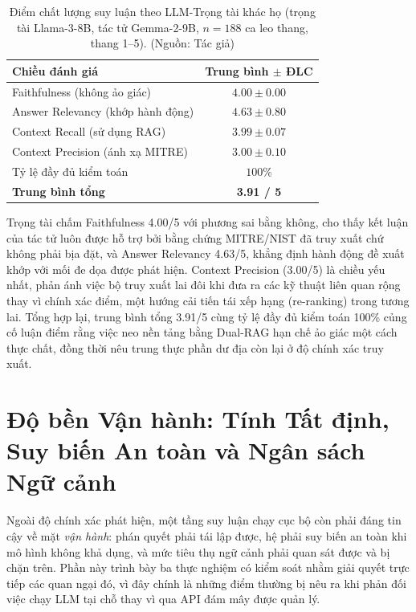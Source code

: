 \begin{table}[!htbp]
    \centering
    \caption{Điểm chất lượng suy luận theo LLM-Trọng tài khác họ (trọng tài Llama-3-8B, tác tử Gemma-2-9B, $n = 188$ ca leo thang, thang 1--5). (Nguồn: Tác giả)}
    \label{tab:ragas}
    \begin{tabular}{|l|c|}
        \hline
        \textbf{Chiều đánh giá} & \textbf{Trung bình $\pm$ ĐLC} \\
        \hline
        Faithfulness (không ảo giác) & $4.00 \pm 0.00$ \\
        \hline
        Answer Relevancy (khớp hành động) & $4.63 \pm 0.80$ \\
        \hline
        Context Recall (sử dụng RAG) & $3.99 \pm 0.07$ \\
        \hline
        Context Precision (ánh xạ MITRE) & $3.00 \pm 0.10$ \\
        \hline
        Tỷ lệ đầy đủ kiểm toán & $100\%$ \\
        \hline
        \textbf{Trung bình tổng} & \textbf{3.91 / 5} \\
        \hline
    \end{tabular}
\end{table}

Trọng tài chấm Faithfulness 4.00/5 với phương sai bằng không, cho thấy kết luận của tác tử luôn được hỗ trợ bởi bằng chứng MITRE/NIST đã truy xuất chứ không phải bịa đặt, và Answer Relevancy 4.63/5, khẳng định hành động đề xuất khớp với mối đe dọa được phát hiện. Context Precision (3.00/5) là chiều yếu nhất, phản ánh việc bộ truy xuất lai đôi khi đưa ra các kỹ thuật liên quan rộng thay vì chính xác điểm, một hướng cải tiến tái xếp hạng (re-ranking) trong tương lai. Tổng hợp lại, trung bình tổng 3.91/5 cùng tỷ lệ đầy đủ kiểm toán 100\% củng cố luận điểm rằng việc neo nền tảng bằng Dual-RAG hạn chế ảo giác một cách thực chất, đồng thời nêu trung thực phần dư địa còn lại ở độ chính xác truy xuất.

\section{Độ bền Vận hành: Tính Tất định, Suy biến An toàn và Ngân sách Ngữ cảnh}
Ngoài độ chính xác phát hiện, một tầng suy luận chạy cục bộ còn phải đáng tin cậy về mặt \emph{vận hành}: phán quyết phải tái lập được, hệ phải suy biến an toàn khi mô hình không khả dụng, và mức tiêu thụ ngữ cảnh phải quan sát được và bị chặn trên. Phần này trình bày ba thực nghiệm có kiểm soát nhằm giải quyết trực tiếp các quan ngại đó, vì đây chính là những điểm thường bị nêu ra khi phản đối việc chạy LLM tại chỗ thay vì qua API đám mây được quản lý.

